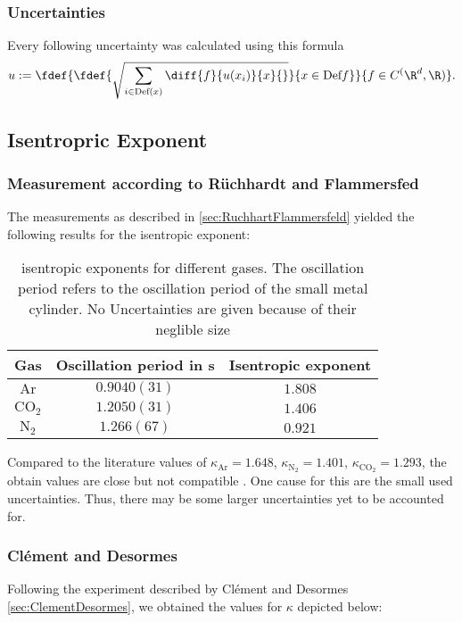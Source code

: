 \documentclass[../main.tex]{subfiles}
\begin{document}
    \subsubsection*{Uncertainties}
        Every following uncertainty was calculated using this formula
        \[u:=\fdef{\fdef{\sqrt{\sum_{i\in\text{Def}(x)}\diff{f}{u(x_i)}{x}{}}}{x\in\text{Def}{f}}}{f\in C^(\R^d,\R)}.\]
		        
        
    \subsection{Isentropric Exponent}
        \subsubsection*{Measurement according to Rüchhardt and Flammersfed}
            The measurements as described in \ref{sec:RuchhartFlammersfeld} yielded the following results for the isentropic exponent:

            \begin{table}[H]
                \centering
                \begin{tabular}{c|c|c}
                    \textbf{Gas} & \textbf{Oscillation period in s} & \textbf{Isentropic exponent}\\
                    \hline
                    $\text{Ar}$ & $0.9040(31)$ & $1.808$\\
                    $\text{CO}_2$ & $1.2050(31)$ & $1.406$\\
                    $\text{N}_2$ & $1.266(67)$ & $0.921$\\
                \end{tabular}
                \caption{isentropic exponents for different gases. The oscillation period refers to the oscillation period of the small metal cylinder. No Uncertainties are given because of their neglible size}
                \label{fig:KappaRuchhardtFlammersfeld}
            \end{table}

            Compared to the literature values of $\kappa_{\text{Ar}}=1.648$, $\kappa_{\text{N}_2}=1.401$, $\kappa_{\text{CO}_2}=1.293$, the obtain values are close but not compatible \cite[p.258]{skript}. One cause for this are the small used uncertainties. Thus, there may be some larger uncertainties yet to be accounted for.

        \subsubsection*{Clément and Desormes}
            Following the experiment described by Clément and Desormes \ref{sec:ClementDesormes}, we obtained the values for $\kappa$ depicted below:
            
\end{document}
